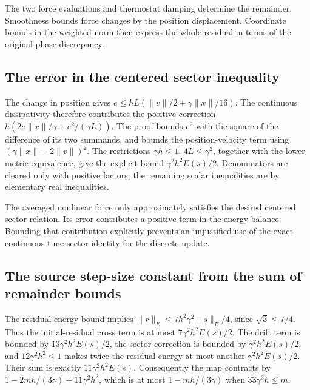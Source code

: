 \documentclass[11pt,a4paper]{report}
\begin{document}
The two force evaluations and thermostat damping determine the remainder. Smoothness bounds force changes by the position displacement. Coordinate bounds in the weighted norm then express the whole residual in terms of the original phase discrepancy.

\subsection{\texorpdfstring{The error in the centered sector inequality}{The error in the centered sector inequality}}
\label{report-step-KineticLangevin-OBABORemainder-lean-4}


The change in position gives \(e\le hL(\|v\|/2+\gamma\|x\|/16)\). The continuous dissipativity therefore contributes the positive correction \(h(2e\|x\|/\gamma+e^2/(\gamma L))\). The proof bounds \(e^2\) with the square of the difference of its two summands, and bounds the position-velocity term using \((\gamma\|x\|-2\|v\|)^2\). The restrictions \(\gamma h\le1\), \(4L\le\gamma^2\), together with the lower metric equivalence, give the explicit bound \(\gamma^2h^2E(s)/2\). Denominators are cleared only with positive factors; the remaining scalar inequalities are by elementary real inequalities.



The averaged nonlinear force only approximately satisfies the desired centered sector relation. Its error contributes a positive term in the energy balance. Bounding that contribution explicitly prevents an unjustified use of the exact continuous-time sector identity for the discrete update.

\subsection{\texorpdfstring{The source step-size constant from the sum of remainder bounds}{The source step-size constant from the sum of remainder bounds}}
\label{report-step-KineticLangevin-OBABORemainder-lean-5}


The residual energy bound implies \(\|r\|_E\le7h^2\gamma^2\|s\|_E/4\), since \(\sqrt3\le7/4\). Thus the initial-residual cross term is at most \(7\gamma^2h^2E(s)/2\). The drift term is bounded by \(13\gamma^2h^2E(s)/2\), the sector correction is bounded by \(\gamma^2h^2E(s)/2\), and \(12\gamma^2h^2\le1\) makes twice the residual energy at most another \(\gamma^2h^2E(s)/2\). Their sum is exactly \(11\gamma^2h^2E(s)\). Consequently the map contracts by \(1-2mh/(3\gamma)+11\gamma^2h^2\), which is at most \(1-mh/(3\gamma)\) when \(33\gamma^3h\le m\).
\end{document}
